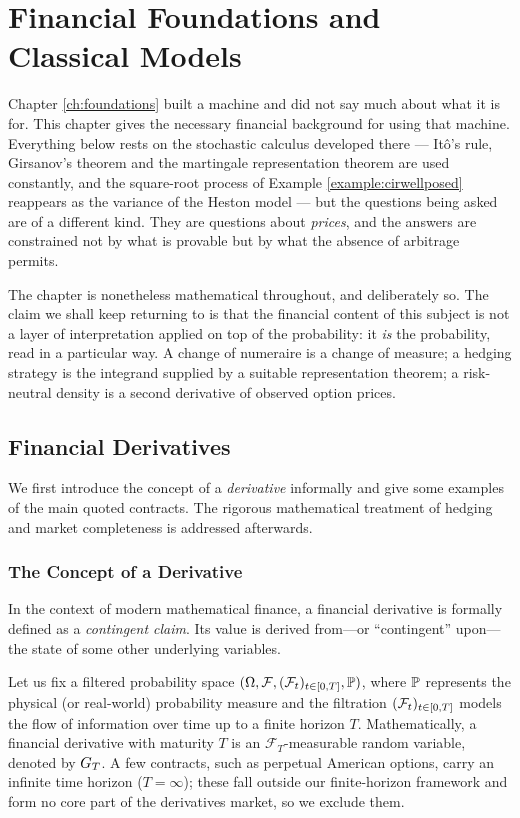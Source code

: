 \chapter{Financial Foundations and Classical Models} \label{ch:finance}

Chapter \ref{ch:foundations} built a machine and did not say much about what it is for. This
chapter gives the necessary financial background for using that machine. Everything below rests on the stochastic calculus developed there --- Itô's
rule, Girsanov's theorem and the martingale representation theorem are used constantly, and the
square-root process of Example \ref{example:cirwellposed} reappears as the variance of the Heston
model --- but the questions being asked are of a different kind. They are questions about
\emph{prices}, and the answers are constrained not by what is provable but by what the absence of
arbitrage permits.

The chapter is nonetheless mathematical throughout, and deliberately so. The claim we shall keep
returning to is that the financial content of this subject is not a layer of interpretation applied
on top of the probability: it \emph{is} the probability, read in a particular way. A change of
numeraire is a change of measure; a hedging strategy is the integrand supplied by a suitable representation
theorem; a risk-neutral density is a second derivative of observed option prices. 

\medskip

\section{Financial Derivatives}\label{sec:derivatives}

We first introduce the concept of a \textit{derivative} informally and give some examples of the main quoted contracts. The rigorous mathematical treatment of hedging and market completeness is addressed afterwards.

\subsection{The Concept of a Derivative}

In the context of modern mathematical finance, a financial derivative is formally defined as a \textit{contingent claim}. Its value is derived from---or ``contingent'' upon---the state of some other underlying variables.

Let us fix a filtered probability space $(\Omega,\mathcal{F},(\mathcal{F}_t)_{t\in[0,T]},\mathbb{P})$, where $\mathbb{P}$ represents the physical (or real-world) probability measure and the filtration $(\mathcal{F}_t)_{t\in[0,T]}$ models the flow of information over time up to a finite horizon $T$. Mathematically, a financial derivative with maturity $T$ is an $\mathcal{F}_T$-measurable random variable, denoted by $G_T$. A few contracts, such as perpetual American options, carry an infinite time horizon ($T=\infty$); these fall outside our finite-horizon framework and form no core part of the derivatives market, so we exclude them.

